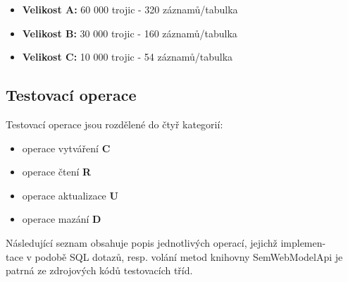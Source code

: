 \documentclass{projekt}
\begin{document}
\begin{itemize}
\item {\bf Velikost A:} 60 000 trojic - 320 záznamů/tabulka
\item {\bf Velikost B:} 30 000 trojic - 160 záznamů/tabulka 
\item {\bf Velikost C:} 10 000 trojic - 54 záznamů/tabulka
\end{itemize}

\subsection{Testovací operace}
\hspace{0.65cm}Testovací operace jsou rozdělené do čtyř kategorií:

\begin{itemize}
\item operace vytváření {\bf C} 
\item operace čtení {\bf R} 
\item operace aktualizace {\bf U} 
\item operace mazání {\bf D} 
\end{itemize}

Následující seznam obsahuje popis jednotlivých operací, jejichž implemen-\\tace v podobě SQL dotazů, resp. volání metod knihovny SemWebModelApi je patrná ze zdrojových kódů testovacích tříd.
\end{document}
